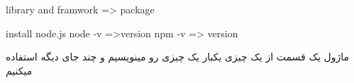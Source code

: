library and framwork => package

install node.js 
node -v  =>version
npm -v  => version

ماژول یک قسمت از یک چیزی
یکبار یک چیزی رو مینویسیم و چند جای دیگه استفاده میکنیم
 